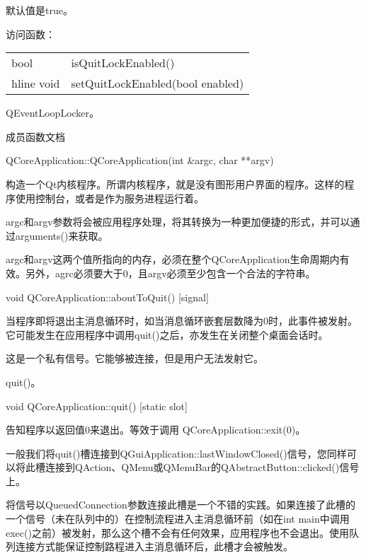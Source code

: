 默认值是true。

访问函数：

\begin{tabular}{|l|l|}
\hline
bool&	isQuitLockEnabled()\\
hline
void&	setQuitLockEnabled(bool enabled)\\
\hline
\end{tabular}


\begin{notice}[另请参阅]
QEventLoopLocker。
\end{notice}

\splitLine

成员函数文档

QCoreApplication::QCoreApplication(int \&argc, char **argv)

构造一个Qt内核程序。所谓内核程序，就是没有图形用户界面的程序。这样的程序使用控制台，或者是作为服务进程运行着。

argc和argv参数将会被应用程序处理，将其转换为一种更加便捷的形式，并可以通过arguments()来获取。


\begin{notice}[ 警告]
argc和argv这两个值所指向的内存，必须在整个QCoreApplication生命周期内有效。另外，agrc必须要大于0，且argv必须至少包含一个合法的字符串。
\end{notice}

void QCoreApplication::aboutToQuit() [signal]

当程序即将退出主消息循环时，如当消息循环嵌套层数降为0时，此事件被发射。它可能发生在应用程序中调用quit()之后，亦发生在关闭整个桌面会话时。



\begin{notice}
这是一个私有信号。它能够被连接，但是用户无法发射它。
\end{notice}

\begin{notice}[另请参阅]
quit()。
\end{notice}

void QCoreApplication::quit() [static slot]

告知程序以返回值0来退出。等效于调用 QCoreApplication::exit(0)。

一般我们将quit()槽连接到QGuiApplication::lastWindowClosed()信号，您同样可以将此槽连接到QAction、QMenu或QMenuBar的QAbstractButton::clicked()信号上。

将信号以QueuedConnection参数连接此槽是一个不错的实践。如果连接了此槽的一个信号（未在队列中的）在控制流程进入主消息循环前（如在int main中调用exec()之前）被发射，那么这个槽不会有任何效果，应用程序也不会退出。使用队列连接方式能保证控制路程进入主消息循环后，此槽才会被触发。

